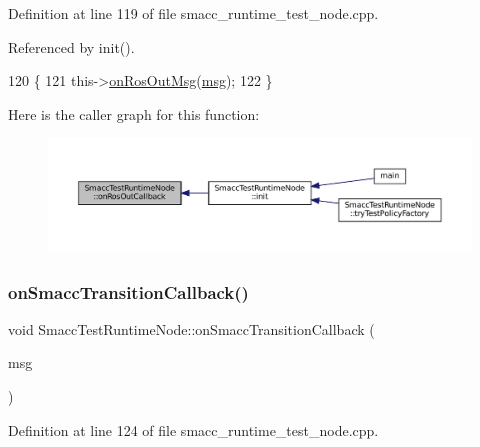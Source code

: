 Definition at line 119 of file smacc\+\_\+runtime\+\_\+test\+\_\+node.\+cpp.



Referenced by init().


\begin{DoxyCode}
120   \{
121       this->\hyperlink{classSmaccTestRuntimeNode_a9b544f3ca3684171cbb56d97aadeac17}{onRosOutMsg}(\hyperlink{namespacebattery__monitor__node_ab1920c64448816edd4064e494275fdff}{msg});
122   \}
\end{DoxyCode}
Here is the caller graph for this function\+:
\nopagebreak
\begin{figure}[H]
\begin{center}
\leavevmode
\includegraphics[width=350pt]{classSmaccTestRuntimeNode_a9d03a2f6a41e75c488f932b7efcb1292_icgraph}
\end{center}
\end{figure}
\mbox{\label{classSmaccTestRuntimeNode_a09b21826547d6ac7de6049611bb1cde8}} 
\subsubsection{\texorpdfstring{on\+Smacc\+Transition\+Callback()}{onSmaccTransitionCallback()}}
{\footnotesize\ttfamily void Smacc\+Test\+Runtime\+Node\+::on\+Smacc\+Transition\+Callback (\begin{DoxyParamCaption}\item[{const smacc\+\_\+msgs\+::\+Smacc\+Transition\+Log\+Entry \&}]{msg }\end{DoxyParamCaption})\hspace{0.3cm}{\ttfamily [inline]}}



Definition at line 124 of file smacc\+\_\+runtime\+\_\+test\+\_\+node.\+cpp.



